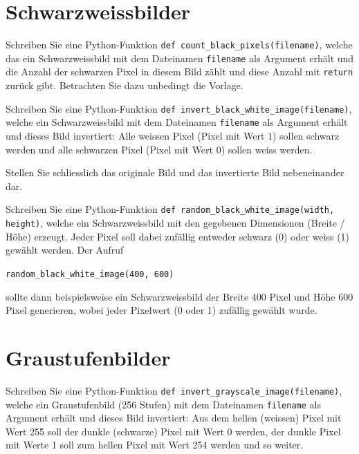 \begin{questions}
	\section*{Schwarzweissbilder}

	Schreiben Sie eine Python-Funktion \lstinline|def count_black_pixels(filename)|, welche das ein Schwarzweissbild mit dem Dateinamen \lstinline|filename| als Argument erhält und die Anzahl der schwarzen Pixel in diesem Bild zählt und diese Anzahl mit \lstinline|return| zurück gibt. Betrachten Sie dazu unbedingt die Vorlage.


	Schreiben Sie eine Python-Funktion \lstinline|def invert_black_white_image(filename)|, welche ein Schwarzweissbild mit dem Dateinamen \lstinline|filename| als Argument erhält und dieses Bild invertiert: Alle weissen Pixel (Pixel mit Wert $1$) sollen schwarz werden und alle schwarzen Pixel (Pixel mit Wert $0$) sollen weiss werden.

	Stellen Sie schliesslich das originale Bild und das invertierte Bild nebeneinander dar.


	Schreiben Sie eine Python-Funktion \lstinline|def random_black_white_image(width, height)|, welche ein Schwarzweissbild mit den gegebenen Dimensionen (Breite / Höhe) erzeugt.
	Jeder Pixel soll dabei zufällig entweder schwarz (0) oder weiss (1) gewählt werden. Der Aufruf
	\begin{center}
		\lstinline|random_black_white_image(400, 600)|
	\end{center}
	sollte dann beispielsweise ein Schwarzweissbild der Breite 400 Pixel und Höhe 600 Pixel generieren, wobei jeder Pixelwert (0 oder 1) zufällig gewählt wurde.

	\section*{Graustufenbilder}


	Schreiben Sie eine Python-Funktion \lstinline|def invert_grayscale_image(filename)|, welche ein Graustufenbild (256 Stufen) mit dem Dateinamen \lstinline|filename| als Argument erhält und dieses Bild invertiert: Aus dem hellen (weissen) Pixel mit Wert 255 soll der dunkle (schwarze) Pixel mit Wert 0 werden, der dunkle Pixel mit Werte 1 soll zum hellen Pixel mit Wert 254 werden und so weiter.


\end{questions}
